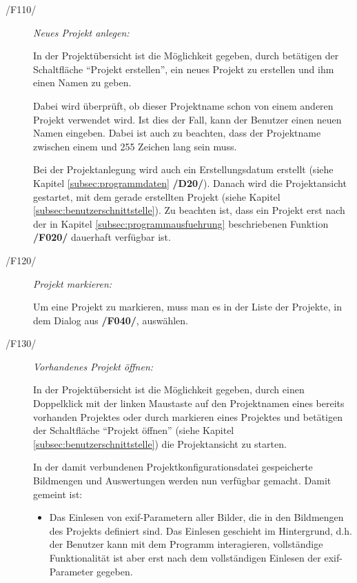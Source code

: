 	\begin{description}		
		
		\item[/F110/] \textit{Neues Projekt anlegen:}\par In der Projektübersicht ist die Möglichkeit gegeben, durch betätigen der Schaltfläche "`Projekt erstellen"', ein neues Projekt zu erstellen und ihm einen Namen zu geben.\par Dabei wird überprüft, ob dieser Projektname schon von einem anderen Projekt verwendet wird. Ist dies der Fall, kann der Benutzer einen neuen Namen eingeben. Dabei ist auch zu beachten, dass der Projektname zwischen einem und 255 Zeichen lang sein muss. \par Bei der Projektanlegung wird auch ein Erstellungsdatum erstellt (siehe Kapitel \ref{subsec:programmdaten} \textbf{/D20/}). Danach wird die Projektansicht gestartet, mit dem gerade erstellten Projekt (siehe Kapitel \ref{subsec:benutzerschnittstelle}). Zu beachten ist, dass ein Projekt erst nach der in Kapitel \ref{subsec:programmausfuehrung} beschriebenen Funktion \textbf{/F020/} dauerhaft verfügbar ist. 
		
		\item[/F120/] \textit{Projekt markieren:}\par Um eine Projekt zu markieren, muss man es in der Liste der Projekte, in dem Dialog aus \textbf{/F040/}, auswählen.
		
		\item[/F130/] \textit{Vorhandenes Projekt öffnen:}\par In der Projektübersicht ist die Möglichkeit gegeben, durch einen Doppelklick mit der linken Maustaste auf den Projektnamen eines bereits vorhanden Projektes oder durch markieren eines Projektes und betätigen der Schaltfläche "`Projekt öffnen"' (siehe Kapitel \ref{subsec:benutzerschnittstelle}) die Projektansicht zu starten.\par In der damit verbundenen Projektkonfigurationsdatei gespeicherte Bildmengen und Auswertungen werden nun verfügbar gemacht. Damit gemeint ist: 
			
			\begin{itemize}
				
				\item Das Einlesen von \gls{exif}-Parametern aller Bilder, die in den Bildmengen des Projekts definiert sind. Das Einlesen geschieht im Hintergrund, d.h. der Benutzer kann mit dem Programm interagieren, vollständige Funktionalität ist aber erst nach dem vollständigen Einlesen der \gls{exif}-Parameter gegeben.
				

\end{itemize}
\end{description}
